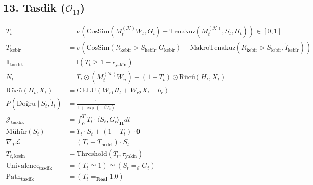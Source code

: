 \documentclass[11pt, a4paper]{article}
\begin{document}
\subsection{13. Tasdik ($\mathcal{O}_{13}$)}
\begin{align}
T_t &= \sigma\left( \text{CosSim}(M_t^{(\mathcal{K})} W_t, G_t) - \text{Tenakuz}(M_t^{(\mathcal{K})}, S_t, H_t) \right) \in [0, 1] \\
T_{\text{kebîr}} &= \sigma\left( \text{CosSim}(R_{\text{kebîr}} \triangleright S_{\text{kebîr}}, G_{\text{kebîr}}) - \text{MakroTenakuz}(R_{\text{kebîr}} \triangleright S_{\text{kebîr}}, \dot{I}_{\text{kebîr}}) \right) \\
\mathbf{1}_{\text{tasdik}} &= \mathbb{I}(T_t \ge 1 - \epsilon_{\text{yakîn}}) \\
N_t &= T_t \odot (M_t^{(\mathcal{K})} W_n) + (1 - T_t) \odot \text{Rücû}(H_t, X_t) \\
\text{Rücû}(H_t, X_t) &= \text{GELU}(W_{r1} H_t + W_{r2} X_t + b_r) \\
P(\text{Doğru} \mid S_t, \dot{I}_t) &= \frac{1}{1 + \exp(-\beta T_t)} \\
\mathcal{J}_{\text{tasdik}} &= \int_0^T T_t \cdot \langle S_t, G_t \rangle_{\mathbf{H}} dt \\
\text{Mühür}(S_t) &= T_t \cdot S_t + (1 - T_t) \cdot \mathbf{0} \\
\nabla_T \mathcal{L} &= (T_t - T_{\text{hedef}}) \cdot S_t \\
T_{t, \text{kesin}} &= \text{Threshold}(T_t, \tau_{\text{yakîn}}) \\
\text{Univalence}_{\text{tasdik}} &= (T_t \simeq 1) \simeq (S_t =_{\mathcal{S}} G_t) \\
\text{Path}_{\text{tasdik}} &= (T_t =_{\mathbf{Real}} 1.0)
\end{align}
\end{document}
